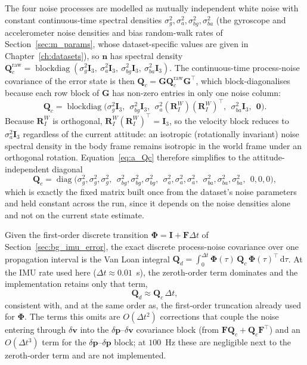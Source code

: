 The four noise processes are modelled as mutually independent white noise with constant continuous-time spectral densities $\sigma_g^2, \sigma_a^2, \sigma_{bg}^2, \sigma_{ba}^2$ (the gyroscope and accelerometer noise densities and bias random-walk rates of Section~\ref{sec:m_params}, whose dataset-specific values are given in Chapter~\ref{ch:datasets}), so $\mathbf{n}$ has spectral density $\mathbf{Q}_c^{\text{raw}} = \operatorname{blockdiag}(\sigma_g^2\mathbf{I}_3,\ \sigma_a^2\mathbf{I}_3,\ \sigma_{bg}^2\mathbf{I}_3,\ \sigma_{ba}^2\mathbf{I}_3)$. The continuous-time process-noise covariance of the error state is then $\mathbf{Q}_c = \mathbf{G}\mathbf{Q}_c^{\text{raw}}\mathbf{G}^\top$, which block-diagonalises because each row block of $\mathbf{G}$ has non-zero entries in only one noise column:
\begin{equation}
  \mathbf{Q}_c = \operatorname{blockdiag}\!\big(\sigma_g^2\mathbf{I}_3,\ \ \sigma_{bg}^2\mathbf{I}_3,\ \ \sigma_a^2(\mathbf{R}_I^W)(\mathbf{R}_I^W)^\top,\ \ \sigma_{ba}^2\mathbf{I}_3,\ \ \mathbf{0}\big).
  \label{eq:a_Qc}
\end{equation}
Because $\mathbf{R}_I^W$ is orthogonal, $\mathbf{R}_I^W(\mathbf{R}_I^W)^\top = \mathbf{I}_3$, so the velocity block reduces to $\sigma_a^2\mathbf{I}_3$ regardless of the current attitude: an isotropic (rotationally invariant) noise spectral density in the body frame remains isotropic in the world frame under an orthogonal rotation. Equation~\ref{eq:a_Qc} therefore simplifies to the attitude-independent diagonal
\begin{equation}
  \mathbf{Q}_c = \operatorname{diag}\!\big(\sigma_g^2, \sigma_g^2, \sigma_g^2,\ \ \sigma_{bg}^2, \sigma_{bg}^2, \sigma_{bg}^2,\ \ \sigma_a^2, \sigma_a^2, \sigma_a^2,\ \ \sigma_{ba}^2, \sigma_{ba}^2, \sigma_{ba}^2,\ \ 0, 0, 0\big),
  \label{eq:a_Qc_diag}
\end{equation}
which is exactly the fixed matrix built once from the dataset's noise parameters and held constant across the run, since it depends on the noise densities alone and not on the current state estimate.

Given the first-order discrete transition $\boldsymbol{\Phi} = \mathbf{I} + \mathbf{F}\Delta t$ of Section~\ref{sec:bg_imu_error}, the exact discrete process-noise covariance over one propagation interval is the Van Loan integral $\mathbf{Q}_d = \int_0^{\Delta t}\boldsymbol{\Phi}(\tau)\,\mathbf{Q}_c\,\boldsymbol{\Phi}(\tau)^\top\,\mathrm{d}\tau$. At the IMU rate used here ($\Delta t \approx 0.01$~s), the zeroth-order term dominates and the implementation retains only that term,
\begin{equation}
  \mathbf{Q}_d \approx \mathbf{Q}_c\,\Delta t,
  \label{eq:a_Qd}
\end{equation}
consistent with, and at the same order as, the first-order truncation already used for $\boldsymbol{\Phi}$. The terms this omits are $O(\Delta t^2)$ corrections that couple the noise entering through $\delta\mathbf{v}$ into the $\delta\mathbf{p}$--$\delta\mathbf{v}$ covariance block (from $\mathbf{F}\mathbf{Q}_c + \mathbf{Q}_c\mathbf{F}^\top$) and an $O(\Delta t^3)$ term for the $\delta\mathbf{p}$--$\delta\mathbf{p}$ block; at $100$~Hz these are negligible next to the zeroth-order term and are not implemented.

